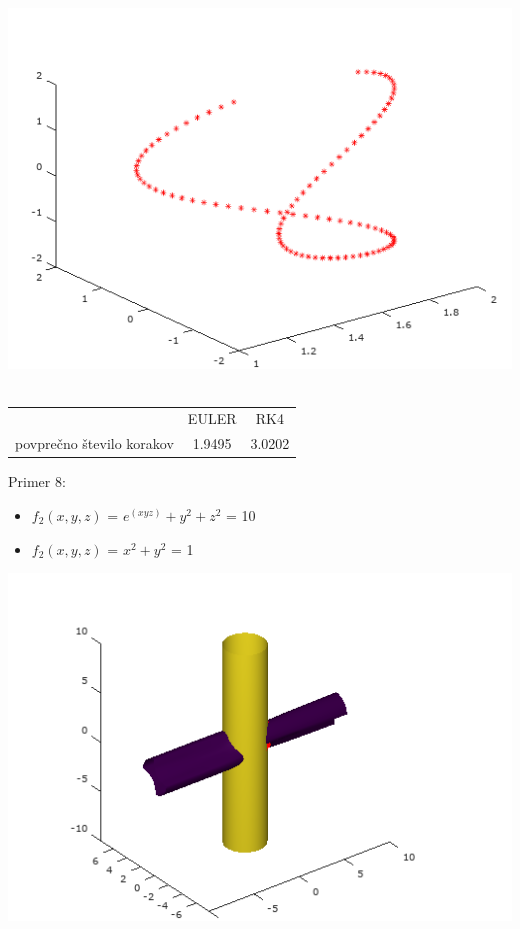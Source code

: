\documentclass[]{article}
\begin{document}
	\includegraphics[scale=0.3]{primer7_4} \\ \\
	\begin{center}
	\begin{tabular}{ |c|c|c| } 
 		\hline
 			 & EULER & RK4 \\ 
			povprečno število korakov & 1.9495 & 3.0202 \\ 
 		\hline
 	\end{tabular}
	\end{center}
	Primer 8:
	\begin{itemize}  
		\item $f_{2}(x,y,z)$ = $e^{(xyz)}+y^{2}+z^{2}$ = 10
		\item $f_{2}(x,y,z)$ =  $x^2 + y^2$ = 1
	\end{itemize}
	\includegraphics[scale=0.3]{primer8_1}
\end{document}
